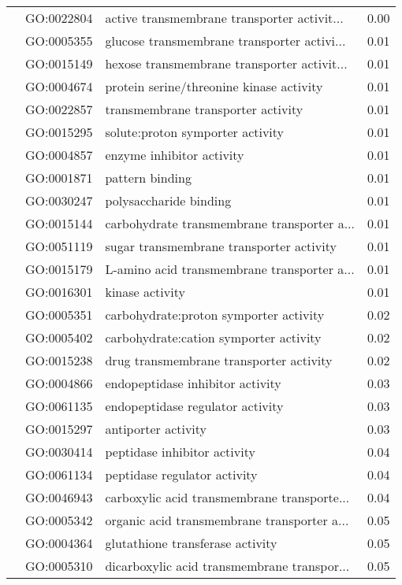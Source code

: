 \begin{longtable}{lllr}
   & GO:0022804 &  active transmembrane transporter activit... &          0.00 \\
   & GO:0005355 &  glucose transmembrane transporter activi... &          0.01 \\
   & GO:0015149 &  hexose transmembrane transporter activit... &          0.01 \\
   & GO:0004674 &     protein serine/threonine kinase activity &          0.01 \\
   & GO:0022857 &           transmembrane transporter activity &          0.01 \\
   & GO:0015295 &             solute:proton symporter activity &          0.01 \\
   & GO:0004857 &                    enzyme inhibitor activity &          0.01 \\
   & GO:0001871 &                              pattern binding &          0.01 \\
   & GO:0030247 &                       polysaccharide binding &          0.01 \\
   & GO:0015144 &  carbohydrate transmembrane transporter a... &          0.01 \\
   & GO:0051119 &     sugar transmembrane transporter activity &          0.01 \\
   & GO:0015179 &  L-amino acid transmembrane transporter a... &          0.01 \\
   & GO:0016301 &                              kinase activity &          0.01 \\
   & GO:0005351 &       carbohydrate:proton symporter activity &          0.02 \\
   & GO:0005402 &       carbohydrate:cation symporter activity &          0.02 \\
   & GO:0015238 &      drug transmembrane transporter activity &          0.02 \\
   & GO:0004866 &             endopeptidase inhibitor activity &          0.03 \\
   & GO:0061135 &             endopeptidase regulator activity &          0.03 \\
   & GO:0015297 &                          antiporter activity &          0.03 \\
   & GO:0030414 &                 peptidase inhibitor activity &          0.04 \\
   & GO:0061134 &                 peptidase regulator activity &          0.04 \\
   & GO:0046943 &  carboxylic acid transmembrane transporte... &          0.04 \\
   & GO:0005342 &  organic acid transmembrane transporter a... &          0.05 \\
   & GO:0004364 &             glutathione transferase activity &          0.05 \\
   & GO:0005310 &  dicarboxylic acid transmembrane transpor... &          0.05 \\
\end{longtable}
